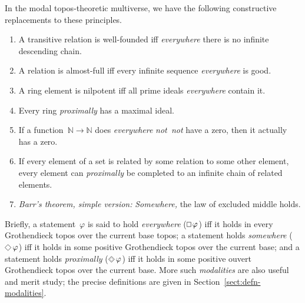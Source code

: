 \documentclass[oneside,reqno]{amsart}
\theoremstyle{definition}
\theoremstyle{plain}
\theoremstyle{remark}
\newcommand{\NN}{\mathbb{N}}
\renewcommand{\_}{\mathpunct{.}\,}
\newcommand{\notnot}{\emph{not~not}\xspace}
\DeclareMathOperator{\possible}{\text{\tikz[scale=.6ex/1cm,baseline=-.6ex,rotate=45,line width=.1ex]{\draw (-1,-1) rectangle (1,1);}}}
\DeclareMathOperator{\necessary}{\text{\tikz[scale=.6ex/1cm,baseline=-.6ex,line width=.1ex]{\draw (-1,-1) rectangle (1,1);}}}
\DeclareMathOperator{\xpossible}{\text{\tikz[scale=.6ex/1cm,baseline=-.6ex,rotate=45,line width=.1ex]{\draw (-1,-1) rectangle (1,1); \draw[very thin] (-.6,-.6) rectangle (.6,.6);}}}
\newcommand{\?}{\,{:}\,}
\begin{document}
In the modal topos-theoretic multiverse, we have the following constructive
replacements to these principles.
\begin{enumerate}
\item A transitive relation is well-founded iff \emph{everywhere} there is no infinite descending
chain.
\item A relation is almost-full iff every infinite sequence \emph{everywhere} is good.
\item A ring element is nilpotent iff all prime
ideals \emph{everywhere} contain it.
\item Every ring \emph{proximally} has a maximal ideal.
\item If a function~$\NN \to \NN$ does \emph{everywhere} \notnot have
a zero, then it actually has a zero.
\item If every element of a set is related by some relation to some other
element, every element can \emph{proximally} be completed to an infinite chain
of related elements.
\item \emph{Barr's theorem, simple version:} \emph{Somewhere,} the law of
excluded middle holds.
\end{enumerate}

Briefly, a statement~$\varphi$ is said to hold \emph{everywhere}
($\necessary\varphi$) iff it holds in every Grothendieck topos over the
current base topos; a statement holds \emph{somewhere} ($\possible\varphi$)
iff it holds in some positive Grothendieck topos over the current base; and a
statement holds \emph{proximally} ($\xpossible\varphi$) iff it holds in
some positive ouvert Grothendieck topos over the current base. More such
\emph{modalities} are also useful and merit study; the precise definitions are
given in Section~\ref{sect:defn-modalities}.
\end{document}
